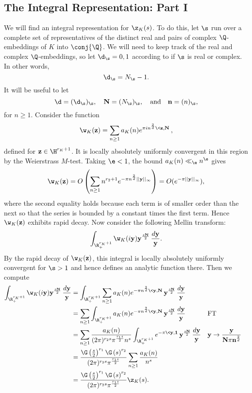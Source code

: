     \subsection*{The Integral Representation: Part I}
      We will find an integral representation for $\z_{K}(s)$. To do this, let $\s$ run over a complete set of representatives of the distinct real and pairs of complex $\Q$-embeddings of $K$ into $\conj{\Q}$. We will need to keep track of the real and complex $\Q$-embeddings, so let $\d_{\s} = 0,1$ according to if $\s$ is real or complex. In other words,
      \[
        \d_{\s} = N_{\s}-1.
      \]
      It will be useful to let
      \[
        \d = (\d_{\s})_{\s}, \quad \mathbf{N} = (N_{\s})_{\s}, \quad \text{and} \quad \mathbf{n} = (n)_{\s},
      \]
      for $n \ge 1$. Consider the function
      \[
        \w_{K}(\mathbf{z}) = \sum_{n \ge 1}a_{K}(n)e^{\pi in^{\frac{2}{d}}\<\mathbf{z},\mathbf{N}\>},
      \]
      defined for $\mathbf{z} \in \H^{r_{K}+1}$. It is locally absolutely uniformly convergent in this region by the Weierstrass $M$-test. Taking $\e < 1$, the bound $a_{K}(n) \ll_{\e} n^{\e}$ gives
      \[
        \w_{K}(\mathbf{z}) = O\left(\sum_{n \ge 1}n^{r_{2}+1}e^{-\pi n^{\frac{2}{d}}||\mathbf{y}||_{\infty}}\right) = O(e^{-\pi||\mathbf{y}||_{\infty}}),
      \]
      where the second equality holds because each term is of smaller order than the next so that the series is bounded by a constant times the first term. Hence $\w_{K}(\mathbf{z})$ exhibits rapid decay. Now consider the following Mellin transform:
      \[
        \int_{\R_{+}^{r_{K}+1}}\w_{K}(i\mathbf{y})\mathbf{y}^{\frac{s\mathbf{N}}{2}}\,\frac{d\mathbf{y}}{\mathbf{y}}.
      \]
      By the rapid decay of $\w_{K}(\mathbf{z})$, this integral is locally absolutely uniformly convergent for $\s > 1$ and hence defines an analytic function there. Then we compute
      \begin{align*}
        \int_{\R_{+}^{r_{K}+1}}\w_{K}(i\mathbf{y})\mathbf{y}^{\frac{s\mathbf{N}}{2}}\,\frac{d\mathbf{y}}{\mathbf{y}} &= \int_{\R_{+}^{r_{K}+1}}\sum_{n \ge 1}a_{K}(n)e^{-\pi n^{\frac{2}{d}}\<\mathbf{y},\mathbf{N}\>}\mathbf{y}^{\frac{s\mathbf{N}}{2}}\,\frac{d\mathbf{y}}{\mathbf{y}} \\
        &= \sum_{n \ge 1}\int_{\R_{+}^{r_{K}+1}}a_{K}(n)e^{-\pi n^{\frac{2}{d}}\<\mathbf{y},\mathbf{N}\>}\mathbf{y}^{\frac{s\mathbf{N}}{2}}\,\frac{d\mathbf{y}}{\mathbf{y}} && \text{FT} \\
        &= \sum_{n \ge 1}\frac{a_{K}(n)}{(2\pi)^{r_{2}s}\pi^{\frac{r_{1}s}{2}}n^{s}}\int_{\R_{+}^{r_{K}+1}}e^{-\pi\<\mathbf{y},\mathbf{1}\>}\mathbf{y}^{\frac{s\mathbf{N}}{2}}\,\frac{d\mathbf{y}}{\mathbf{y}} && \text{$\mathbf{y} \to \frac{\mathbf{y}}{\mathbf{N}\pi\mathbf{n}^{\frac{2}{d}}}$} \\
        &= \frac{\G\left(\frac{s}{2}\right)^{r_{1}}\G\left(s\right)^{r_{2}}}{(2\pi)^{r_{2}s}\pi^{\frac{r_{1}s}{2}}}\sum_{n \ge 1}\frac{a_{K}(n)}{n^{s}} \\
        &= \frac{\G\left(\frac{s}{2}\right)^{r_{1}}\G\left(s\right)^{r_{2}}}{(2\pi)^{r_{2}s}\pi^{\frac{r_{1}s}{2}}}\z_{K}(s).
      \end{align*}
